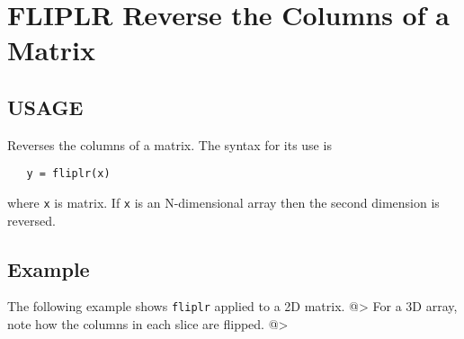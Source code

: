 \section{FLIPLR Reverse the Columns of a Matrix}

\subsection{USAGE}

Reverses the columns of a matrix.  The syntax for its use is
\begin{verbatim}
   y = fliplr(x)
\end{verbatim}
where \verb|x| is matrix.  If \verb|x| is an N-dimensional array then
the second dimension is reversed.
\subsection{Example}

The following example shows \verb|fliplr| applied to a 2D matrix.
@>
For a 3D array, note how the columns in each slice are flipped.
@>
